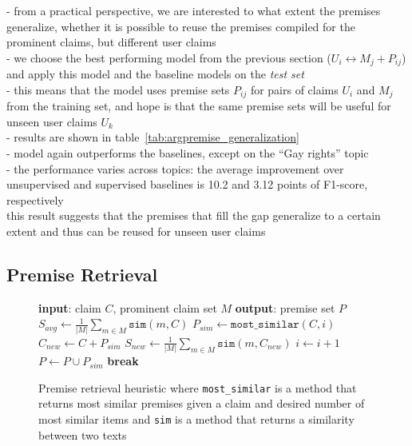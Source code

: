 - from a practical perspective, we are interested to what extent the premises
generalize, whether it is possible to reuse the premises compiled for the
prominent claims, but different user claims \\
- we choose the best performing model from the previous section ($U_i \leftrightarrow M_j + P_{ij}$)
and apply this model and the baseline models on the \emph{test set} \\
- this means that the model uses premise sets $P_{ij}$ for pairs of claims
$U_i$ and $M_j$ from the training set, and hope is that the same premise sets will be useful
for unseen user claims $U_k$ \\
- results are shown in table~\ref{tab:argpremise_generalization}\\
- model again outperforms the baselines, except on the ``Gay rights'' topic \\
- the performance varies across topics: the average improvement over unsupervised
and supervised baselines is 10.2 and 3.12 points of F1-score, respectively \\
 this result suggests that the premises that fill the gap generalize to a certain
 extent and thus can be reused for unseen user claims \\

\subsection{Premise Retrieval}

\begin{figure}
\begin{algorithmic}[1]
\State \textbf{input}: claim $C$, prominent claim set $M$
\State \textbf{output}: premise set $P$
\State
\State $S_{avg} \gets \frac{1}{|M|} \sum_{m \in M} \mathtt{sim}(m, C)$
  \State $P_{sim} \gets \mathtt{most\_similar}(C, i)$
  \State $C_{new} \gets C + P_{sim}$
  \State $S_{new} \gets \frac{1}{|M|} \sum_{m \in M} \mathtt{sim}(m, C_{new})$
  \State
    \State $i \gets i + 1$
    \State $P \gets P \cup P_{sim}$
  \Else
    \State \textbf{break}
  \EndIf
  \State
\EndFor
\end{algorithmic}
\caption{Premise retrieval heuristic where \texttt{most\_similar} is a method that returns most similar
premises given a claim and desired number of most similar items and
\texttt{sim} is a method that returns a similarity between two texts}
\label{alg:premise_retrieval}
\end{figure}


